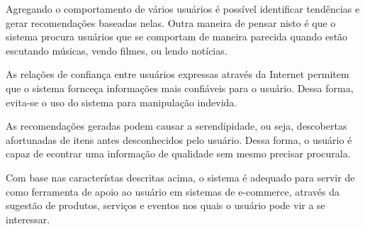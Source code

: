  Agregando o comportamento de vários usuários é possível identificar tendências e gerar recomendações baseadas nelas. Outra maneira de pensar nisto é que o sistema procura usuários que se comportam de maneira parecida quando estão escutando músicas, vendo filmes, ou lendo notícias.
 
 As relações de confiança entre usuários expressas através da Internet permitem que o sistema fornceça informações mais confiáveis para o usuário. Dessa forma, evita-se o uso do sistema para manipulação indevida.

 As recomendações geradas podem causar a serendipidade, ou seja, descobertas afortunadas de itens antes desconhecidos pelo usuário. Dessa forma, o usuário é capaz de econtrar uma informação de qualidade sem mesmo precisar procurala.

 Com base nas característas descritas acima, o sistema é adequado para servir de como ferramenta de apoio ao usuário em sistemas de e-commerce, através da sugestão de produtos, serviços e eventos nos quais o usuário pode vir a se interessar.